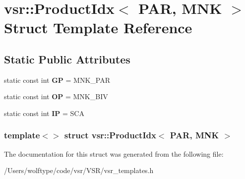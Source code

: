 \hypertarget{structvsr_1_1_product_idx_3_01_p_a_r_00_01_m_n_k_01_4}{\section{vsr\-:\-:Product\-Idx$<$ P\-A\-R, M\-N\-K $>$ Struct Template Reference}
\label{structvsr_1_1_product_idx_3_01_p_a_r_00_01_m_n_k_01_4}
}
\subsection*{Static Public Attributes}
\begin{DoxyCompactItemize}
\item 
\hypertarget{structvsr_1_1_product_idx_3_01_p_a_r_00_01_m_n_k_01_4_af6fbb3b5aa81aff9e8593f88a6327557}{static const int {\bfseries G\-P} = M\-N\-K\-\_\-\-P\-A\-R}\label{structvsr_1_1_product_idx_3_01_p_a_r_00_01_m_n_k_01_4_af6fbb3b5aa81aff9e8593f88a6327557}

\item 
\hypertarget{structvsr_1_1_product_idx_3_01_p_a_r_00_01_m_n_k_01_4_a86f235d062dfadf539c0b667a84dbaf4}{static const int {\bfseries O\-P} = M\-N\-K\-\_\-\-B\-I\-V}\label{structvsr_1_1_product_idx_3_01_p_a_r_00_01_m_n_k_01_4_a86f235d062dfadf539c0b667a84dbaf4}

\item 
\hypertarget{structvsr_1_1_product_idx_3_01_p_a_r_00_01_m_n_k_01_4_a5a2834ccab0bd3124f52ca5188ebd8d7}{static const int {\bfseries I\-P} = S\-C\-A}\label{structvsr_1_1_product_idx_3_01_p_a_r_00_01_m_n_k_01_4_a5a2834ccab0bd3124f52ca5188ebd8d7}

\end{DoxyCompactItemize}
\subsubsection*{template$<$$>$ struct vsr\-::\-Product\-Idx$<$ P\-A\-R, M\-N\-K $>$}



The documentation for this struct was generated from the following file\-:\begin{DoxyCompactItemize}
\item 
/\-Users/wolftype/code/vsr/\-V\-S\-R/vsr\-\_\-templates.\-h\end{DoxyCompactItemize}
